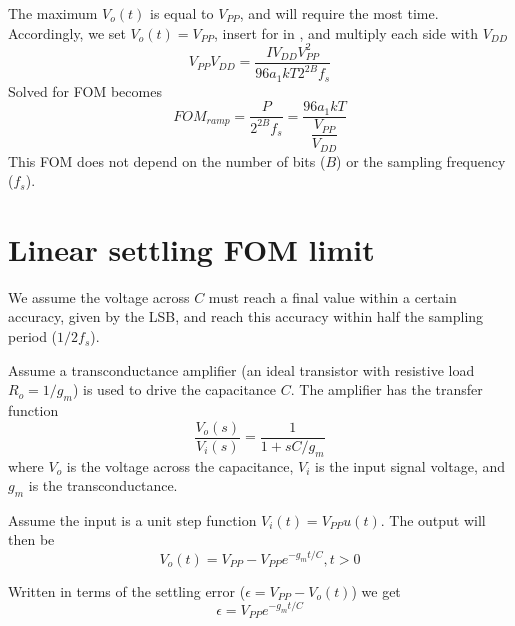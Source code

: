  The maximum 
$V_o(t)$ is equal to $V_{PP}$, and will require the most time. Accordingly, we
set $V_o(t) = V_{PP}$, insert for  in , and
multiply each side with $V_{DD}$ 
\begin{equation}
\label{eq:const2}
  V_{PP}V_{DD} = \dfrac{I V_{DD} V_{PP}^2}{96 a_1 k T 2^{2B} f_s}
\end{equation}  
Solved for FOM  becomes
\begin{equation}
\label{eq:ramp}
  FOM_{ramp} = \dfrac{P}{2^{2B}f_s} = \dfrac{96 a_1 kT }{\dfrac{V_{PP}}{V_{DD}}}
\end{equation}
 This FOM does not depend on the number of bits
($B$) or the sampling frequency ($f_s$).

\section{Linear settling FOM limit}
We assume the voltage across $C$ must reach a final value within a certain accuracy,
given by the LSB, and reach this accuracy
within half the sampling period
($1/2f_s$). 

Assume a transconductance amplifier (an ideal transistor with
resistive load $R_o = 1/g_m$) is used to drive the capacitance
$C$. The amplifier has the transfer function
\begin{equation}
  \dfrac{V_o(s)}{V_i(s)} = \dfrac{1}{1 + s C/g_m}
\end{equation}
 where $V_o$ is the voltage across the capacitance, $V_i$ is the
 input signal voltage, and $g_m$ is the
 transconductance.

Assume the input is a unit step function $V_i(t) = V_{PP}u(t)$. The
output will then be
\begin{equation}
V_o(t) = V_{PP}-V_{PP}e^{-g_m t /C}, t > 0
\end{equation}

Written in terms of the settling error ($\epsilon = V_{PP} -
V_o(t)$) we get
\begin{equation}
\label{eq:epsi}
\epsilon = V_{PP} e^{- g_m t/C }
\end{equation}

